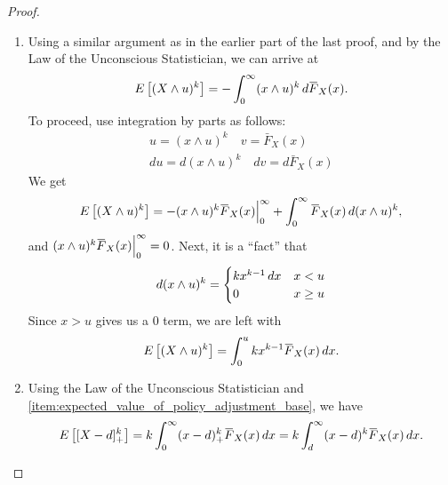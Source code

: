 \documentclass[notoc,notitlepage]{tufte-book}
\begin{document}
\begin{proof}
\begin{enumerate}
    \item Using a similar argument as in the earlier part of the last proof, and by the Law of the Unconscious Statistician, we can arrive at
      \begin{equation*}
        E \left[ ( X \land u )^k \right] = - \int_{0}^{\infty} (x \land u)^k \dif{\bar{F}_X(x)}.
      \end{equation*}
      To proceed, use integration by parts as follows:
      \begin{gather*}
        u = ( x \land u )^k \quad v = \bar{F}_X(x) \\
        du = d(x \land u)^k \quad dv = d\bar{F}_X(x)
      \end{gather*}
      We get
      \begin{equation*}
        E \left[ ( X \land u )^k \right] = - (x \land u)^k \bar{F}_X(x) \at{0}{\infty} + \int_{0}^{\infty} \bar{F}_X(x) \dif{( x \land u )^k},
      \end{equation*}
      and $(x \land u)^k \bar{F}_X(x) \at{0}{\infty} = 0$. Next, it is a ``fact'' that
      \begin{equation*}
        d ( x \land u )^k = \begin{cases}
          k x^{k - 1} \mathop{}\!d{x} & x < u \\
          0                   & x \geq u
        \end{cases}
      \end{equation*}
      Since $x > u$ gives us a $0$ term, we are left with
      \begin{equation*}
        E \left[ (X \land u)^k \right] = \int_{0}^{u} k x^{k-1} \bar{F}_X(x) \dif{x}.
      \end{equation*}
      
    \item Using the Law of the Unconscious Statistician and \cref{item:expected_value_of_policy_adjustment_base}, we have
      \begin{equation*}
        E \left[ [ X - d ]_+^k \right] = k \int_{0}^{\infty} (x - d)_+^k \bar{F}_X(x) \dif{x} = k \int_{d}^{\infty} (x - d)^k \bar{F}_X(x) \dif{x}.
      \end{equation*}


\end{enumerate}
\end{proof}
\end{document}
